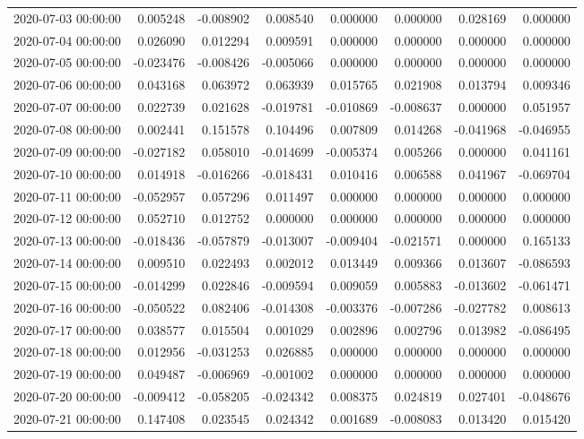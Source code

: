 \begin{tabular}{lrrrrrrr}
2020-07-03 00:00:00 & 0.005248 & -0.008902 & 0.008540 & 0.000000 & 0.000000 & 0.028169 & 0.000000 \\
2020-07-04 00:00:00 & 0.026090 & 0.012294 & 0.009591 & 0.000000 & 0.000000 & 0.000000 & 0.000000 \\
2020-07-05 00:00:00 & -0.023476 & -0.008426 & -0.005066 & 0.000000 & 0.000000 & 0.000000 & 0.000000 \\
2020-07-06 00:00:00 & 0.043168 & 0.063972 & 0.063939 & 0.015765 & 0.021908 & 0.013794 & 0.009346 \\
2020-07-07 00:00:00 & 0.022739 & 0.021628 & -0.019781 & -0.010869 & -0.008637 & 0.000000 & 0.051957 \\
2020-07-08 00:00:00 & 0.002441 & 0.151578 & 0.104496 & 0.007809 & 0.014268 & -0.041968 & -0.046955 \\
2020-07-09 00:00:00 & -0.027182 & 0.058010 & -0.014699 & -0.005374 & 0.005266 & 0.000000 & 0.041161 \\
2020-07-10 00:00:00 & 0.014918 & -0.016266 & -0.018431 & 0.010416 & 0.006588 & 0.041967 & -0.069704 \\
2020-07-11 00:00:00 & -0.052957 & 0.057296 & 0.011497 & 0.000000 & 0.000000 & 0.000000 & 0.000000 \\
2020-07-12 00:00:00 & 0.052710 & 0.012752 & 0.000000 & 0.000000 & 0.000000 & 0.000000 & 0.000000 \\
2020-07-13 00:00:00 & -0.018436 & -0.057879 & -0.013007 & -0.009404 & -0.021571 & 0.000000 & 0.165133 \\
2020-07-14 00:00:00 & 0.009510 & 0.022493 & 0.002012 & 0.013449 & 0.009366 & 0.013607 & -0.086593 \\
2020-07-15 00:00:00 & -0.014299 & 0.022846 & -0.009594 & 0.009059 & 0.005883 & -0.013602 & -0.061471 \\
2020-07-16 00:00:00 & -0.050522 & 0.082406 & -0.014308 & -0.003376 & -0.007286 & -0.027782 & 0.008613 \\
2020-07-17 00:00:00 & 0.038577 & 0.015504 & 0.001029 & 0.002896 & 0.002796 & 0.013982 & -0.086495 \\
2020-07-18 00:00:00 & 0.012956 & -0.031253 & 0.026885 & 0.000000 & 0.000000 & 0.000000 & 0.000000 \\
2020-07-19 00:00:00 & 0.049487 & -0.006969 & -0.001002 & 0.000000 & 0.000000 & 0.000000 & 0.000000 \\
2020-07-20 00:00:00 & -0.009412 & -0.058205 & -0.024342 & 0.008375 & 0.024819 & 0.027401 & -0.048676 \\
2020-07-21 00:00:00 & 0.147408 & 0.023545 & 0.024342 & 0.001689 & -0.008083 & 0.013420 & 0.015420 \\

\end{tabular}
